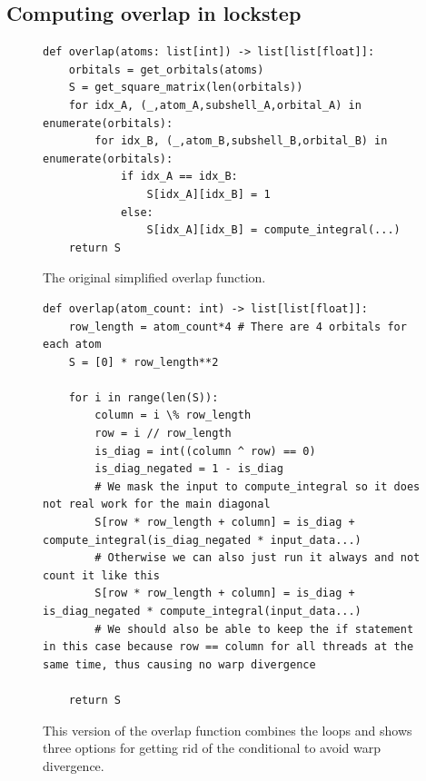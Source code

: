 \subsection{Computing overlap in lockstep}

\begin{figure}[H]
\begin{verbatim}
def overlap(atoms: list[int]) -> list[list[float]]:
    orbitals = get_orbitals(atoms)
    S = get_square_matrix(len(orbitals))
    for idx_A, (_,atom_A,subshell_A,orbital_A) in enumerate(orbitals):
        for idx_B, (_,atom_B,subshell_B,orbital_B) in enumerate(orbitals):
            if idx_A == idx_B:
                S[idx_A][idx_B] = 1
            else:
                S[idx_A][idx_B] = compute_integral(...)
    return S
\end{verbatim}
\caption{The original simplified overlap function.}
\end{figure}

\begin{figure}[H]
\begin{verbatim}
def overlap(atom_count: int) -> list[list[float]]:
    row_length = atom_count*4 # There are 4 orbitals for each atom
    S = [0] * row_length**2

    for i in range(len(S)):
        column = i \% row_length
        row = i // row_length
        is_diag = int((column ^ row) == 0)
        is_diag_negated = 1 - is_diag
        # We mask the input to compute_integral so it does not real work for the main diagonal
        S[row * row_length + column] = is_diag + compute_integral(is_diag_negated * input_data...)
        # Otherwise we can also just run it always and not count it like this
        S[row * row_length + column] = is_diag + is_diag_negated * compute_integral(input_data...)
        # We should also be able to keep the if statement in this case because row == column for all threads at the same time, thus causing no warp divergence

    return S
\end{verbatim}
\caption{This version of the overlap function combines the loops and shows three options for getting rid of the conditional to avoid warp divergence.}
\end{figure}



